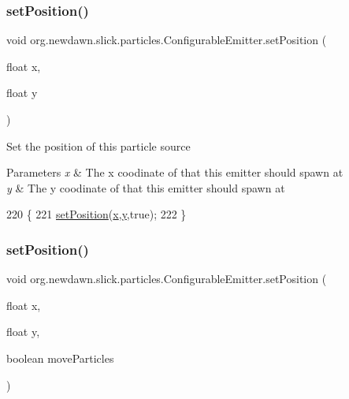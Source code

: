 \subsubsection{\texorpdfstring{set\+Position()}{setPosition()}\hspace{0.1cm}{\footnotesize\ttfamily [1/2]}}
{\footnotesize\ttfamily void org.\+newdawn.\+slick.\+particles.\+Configurable\+Emitter.\+set\+Position (\begin{DoxyParamCaption}\item[{float}]{x,  }\item[{float}]{y }\end{DoxyParamCaption})\hspace{0.3cm}{\ttfamily [inline]}}

Set the position of this particle source


\begin{DoxyParams}{Parameters}
{\em x} & The x coodinate of that this emitter should spawn at \\
\hline
{\em y} & The y coodinate of that this emitter should spawn at \\
\hline
\end{DoxyParams}

\begin{DoxyCode}
220                                               \{
221         \mbox{\hyperlink{classorg_1_1newdawn_1_1slick_1_1particles_1_1_configurable_emitter_a6c1e45f4ce5a92528636c6bb085c7370}{setPosition}}(\mbox{\hyperlink{classorg_1_1newdawn_1_1slick_1_1particles_1_1_configurable_emitter_a4198d77b5f4ee2b55be6e4732744b9cb}{x}},\mbox{\hyperlink{classorg_1_1newdawn_1_1slick_1_1particles_1_1_configurable_emitter_af1da7225bf1c489ad9a5323bf2a20ade}{y}},\textcolor{keyword}{true});
222     \}
\end{DoxyCode}
\mbox{\label{classorg_1_1newdawn_1_1slick_1_1particles_1_1_configurable_emitter_a8dab62d552f4f52590cb3a332c74540b}} 
\subsubsection{\texorpdfstring{set\+Position()}{setPosition()}\hspace{0.1cm}{\footnotesize\ttfamily [2/2]}}
{\footnotesize\ttfamily void org.\+newdawn.\+slick.\+particles.\+Configurable\+Emitter.\+set\+Position (\begin{DoxyParamCaption}\item[{float}]{x,  }\item[{float}]{y,  }\item[{boolean}]{move\+Particles }\end{DoxyParamCaption})\hspace{0.3cm}{\ttfamily [inline]}}

